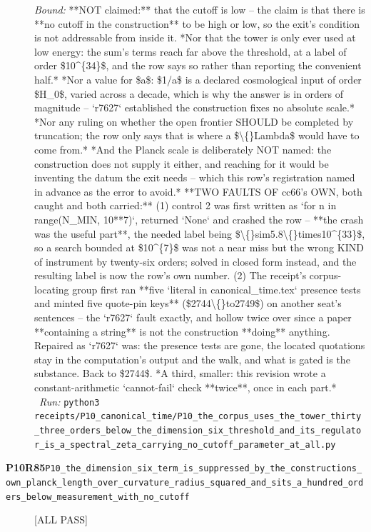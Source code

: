 \begin{description}
 \emph{Bound:} **NOT claimed:** that the cutoff is low -- the claim is that there is **no cutoff in the construction** to be high or low, so the exit's condition is not addressable from inside it.  *Nor that the tower is only ever used at low energy: the sum's terms reach far above the threshold, at a label of order \$10\textasciicircum{}\{34\}\$, and the row says so rather than reporting the convenient half.*  *Nor a value for \$a\$: \$1/a\$ is a declared cosmological input of order \$H\_0\$, varied across a decade, which is why the answer is in orders of magnitude -- `r7627` established the construction fixes no absolute scale.*  *Nor any ruling on whether the open frontier SHOULD be completed by truncation; the row only says that is where a \$\textbackslash\{\}Lambda\$ would have to come from.*  *And the Planck scale is deliberately NOT named: the construction does not supply it either, and reaching for it would be inventing the datum the exit needs -- which this row's registration named in advance as the error to avoid.*  **TWO FAULTS OF cc66's OWN, both caught and both carried:** (1) control 2 was first written as `for n in range(N\_MIN, 10**7)`, returned `None` and crashed the row -- **the crash was the useful part**, the needed label being \$\textbackslash\{\}sim5.8\textbackslash\{\}times10\textasciicircum{}\{33\}\$, so a search bounded at \$10\textasciicircum{}\{7\}\$ was not a near miss but the wrong KIND of instrument by twenty-six orders; solved in closed form instead, and the resulting label is now the row's own number. (2) The receipt's corpus-locating group first ran **five `literal in canonical\_time.tex` presence tests and minted five quote-pin keys** (\$2744\textbackslash\{\}to2749\$) on another seat's sentences -- the `r7627` fault exactly, and hollow twice over since a paper **containing a string** is not the construction **doing** anything. Repaired as `r7627` was: the presence tests are gone, the located quotations stay in the computation's output and the walk, and what is gated is the substance. Back to \$2744\$.  *A third, smaller: this revision wrote a constant-arithmetic `cannot-fail` check **twice**, once in each part.*
\ \emph{Run:} \texttt{python3 receipts/P10\_canonical\_time/P10\_the\_corpus\_uses\_the\_tower\_thirty\_three\_orders\_below\_the\_dimension\_six\_threshold\_and\_its\_regulator\_is\_a\_spectral\_zeta\_carrying\_no\_cutoff\_parameter\_at\_all.py}
\item[\rcptlabel{P10_the_dimension_six_term_is_suppressed_by_the_constructions_own_planck_length_over_curvature_radius_squared_and_sits_a_hundred_orders_below_measurement_with_no_cutoff}{P10R85}\textbf{P10R85}\quad\texttt{P10\_the\_dimension\_six\_term\_is\_suppressed\_by\_the\_constructions\_own\_planck\_length\_over\_curvature\_radius\_squared\_and\_sits\_a\_hundred\_orders\_below\_measurement\_with\_no\_cutoff}]\hfill\textsf{[ALL PASS]}\\

\end{description}
